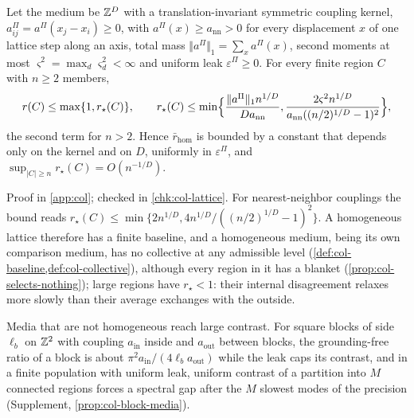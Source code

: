 \begin{theorem}\label{thm:col-lattice-contrast}
Let the medium be $\mathbb{Z}^D$ with a translation-invariant symmetric coupling kernel, $a^\Pi_{ij}=a^\Pi(x_j-x_i)\ge0$, with $a^\Pi(x)\ge a_{\mathrm{nn}}>0$ for every displacement $x$ of one lattice step along an axis, total mass $\Vert a^\Pi\Vert_1=\sum_xa^\Pi(x)$, second moments at most $\varsigma^2=\max_d\varsigma_d^2<\infty$ and uniform leak $\varepsilon^\Pi\ge0$. For every finite region $C$ with $n\ge2$ members,
\begin{equation}\label{eq:col-lattice}
r(C)\le\max\{1,r_\star(C)\},\qquad r_\star(C)\le\min\Bigl\{\frac{\Vert a^\Pi\Vert_1n^{1/D}}{Da_{\mathrm{nn}}},\frac{2\varsigma^2n^{1/D}}{a_{\mathrm{nn}}((n/2)^{1/D}-1)^2}\Bigr\},
\end{equation}
the second term for $n>2$. Hence $\bar r_{\mathrm{hom}}$ is bounded by a constant that depends only on the kernel and on $D$, uniformly in $\varepsilon^\Pi$, and $\sup_{|C|\ge n}r_\star(C)=O(n^{-1/D})$.
\end{theorem}
Proof in \cref{app:col}; checked in \cref{chk:col-lattice}. For nearest-neighbor couplings the bound reads $r_\star(C)\le\min\{2n^{1/D},4n^{1/D}/((n/2)^{1/D}-1)^2\}$. A homogeneous lattice therefore has a finite baseline, and a homogeneous medium, being its own comparison medium, has no collective at any admissible level (\cref{def:col-baseline,def:col-collective}), although every region in it has a blanket (\cref{prop:col-selects-nothing}); large regions have $r_\star<1$: their internal disagreement relaxes more slowly than their average exchanges with the outside.

Media that are not homogeneous reach large contrast. For square blocks of side $\ell_b$ on $\mathbb{Z}^2$ with coupling $a_{\mathrm{in}}$ inside and $a_{\mathrm{out}}$ between blocks, the grounding-free ratio of a block is about $\pi^2a_{\mathrm{in}}/(4\ell_ba_{\mathrm{out}})$ while the leak caps its contrast, and in a finite population with uniform leak, uniform contrast of a partition into $M$ connected regions forces a spectral gap after the $M$ slowest modes of the precision (Supplement, \cref{prop:col-block-media}).


